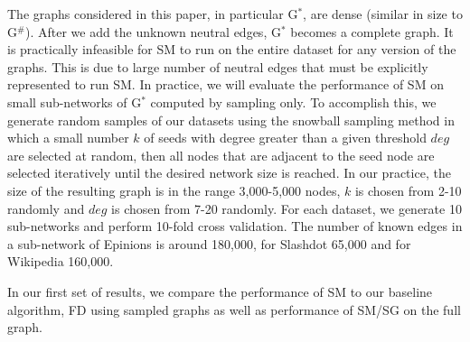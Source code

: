 \documentclass[acmtweb]{acmsmall}
\begin{document}
The graphs considered in this paper, in particular G$^*$, are dense
(similar in size to G$^\#$). After we add the unknown neutral edges,
G$^*$ becomes a complete graph.  It is practically infeasible for SM
to run on the entire dataset for any version of the graphs. This is
due to large number of neutral edges that must be explicitly
represented to run SM.  In practice, we will evaluate the performance
of SM on small sub-networks of G$^*$ computed by sampling only. To
accomplish this, we generate random samples of our datasets using the
snowball sampling method in which a small number $k$ of seeds with
degree greater than a given threshold $deg$ are selected at random,
then all nodes that are adjacent to the seed node are selected
iteratively until the desired network size is reached.  In our
practice, the size of the resulting graph is in the range 3,000-5,000
nodes, $k$ is chosen from 2-10 randomly and $deg$ is chosen from 7-20
randomly. For each dataset, we generate 10 sub-networks and perform
10-fold cross validation. The number of known edges in a sub-network
of Epinions is around 180,000, for Slashdot 65,000 and for Wikipedia
160,000.

In our first set of results, we compare the performance of SM to our
baseline algorithm, FD using sampled graphs as well as performance of
SM/SG on the full graph.
\end{document}
